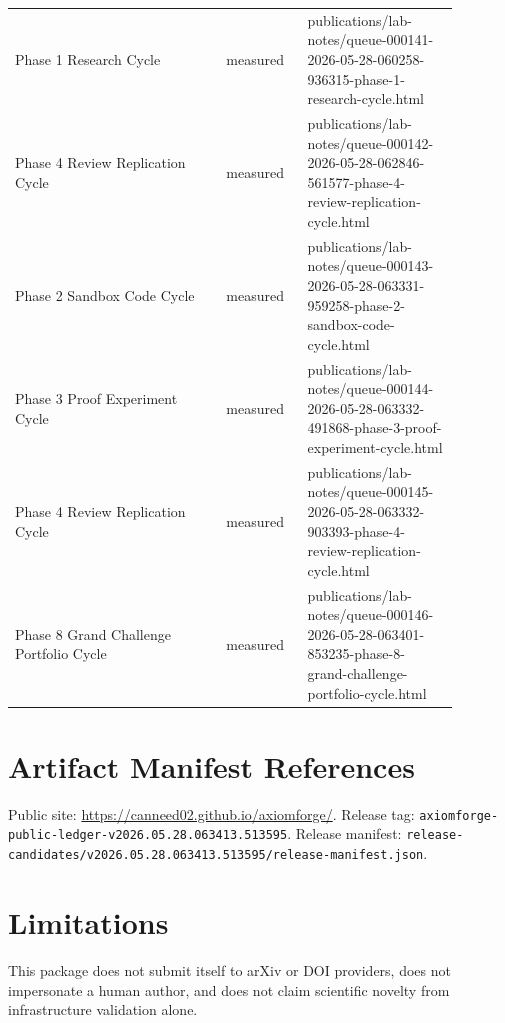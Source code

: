 \documentclass[11pt]{article}
\begin{document}
\begin{longtable}{p{0.42\linewidth}p{0.16\linewidth}p{0.30\linewidth}}
Phase 1 Research Cycle & measured & publications/lab-notes/queue-000141-2026-05-28-060258-936315-phase-1-research-cycle.html \\
Phase 4 Review Replication Cycle & measured & publications/lab-notes/queue-000142-2026-05-28-062846-561577-phase-4-review-replication-cycle.html \\
Phase 2 Sandbox Code Cycle & measured & publications/lab-notes/queue-000143-2026-05-28-063331-959258-phase-2-sandbox-code-cycle.html \\
Phase 3 Proof Experiment Cycle & measured & publications/lab-notes/queue-000144-2026-05-28-063332-491868-phase-3-proof-experiment-cycle.html \\
Phase 4 Review Replication Cycle & measured & publications/lab-notes/queue-000145-2026-05-28-063332-903393-phase-4-review-replication-cycle.html \\
Phase 8 Grand Challenge Portfolio Cycle & measured & publications/lab-notes/queue-000146-2026-05-28-063401-853235-phase-8-grand-challenge-portfolio-cycle.html \\
\end{longtable}

\section*{Artifact Manifest References}
Public site: \url{https://canneed02.github.io/axiomforge/}. Release tag:
\texttt{axiomforge-public-ledger-v2026.05.28.063413.513595}.
Release manifest:
\texttt{release-candidates/v2026.05.28.063413.513595/release-manifest.json}.

\section*{Limitations}
This package does not submit itself to arXiv or DOI providers, does not
impersonate a human author, and does not claim scientific novelty from
infrastructure validation alone.



\end{document}
